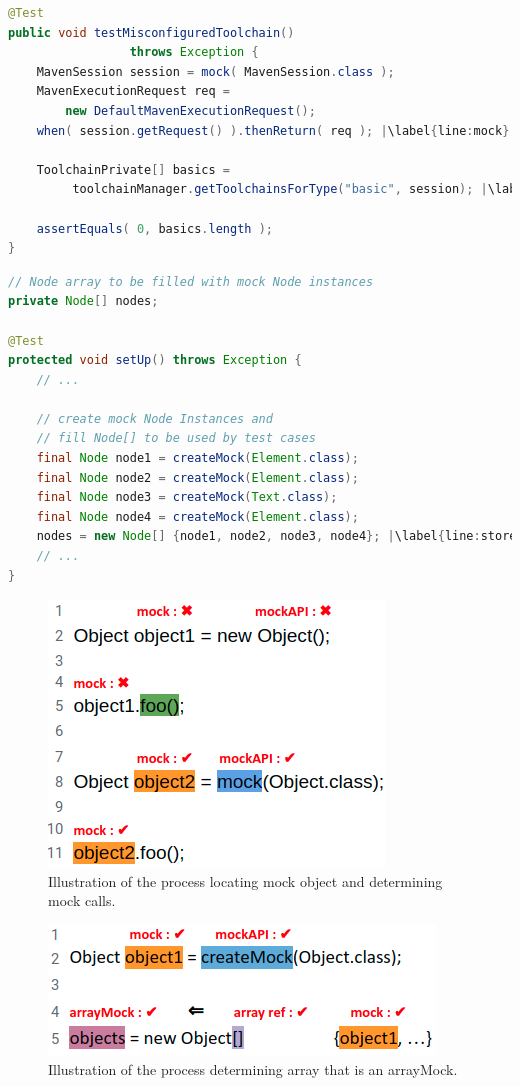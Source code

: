 \begin{lstlisting}[basicstyle=\ttfamily, caption={This code snippet illustrates an example from maven-core, where both the focal method \texttt{getToolchainsForType} and a method invocation \texttt{getRequest} on a mock object occur in test \textit{testMisconfiguredToolchain()}},
basicstyle=\scriptsize\ttfamily,language = Java, framesep=4.5mm, escapechar=|,
framexleftmargin=1.0mm, captionpos=b, xleftmargin=3.5ex, label=lis:mockCall]
@Test
public void testMisconfiguredToolchain()
                 throws Exception {
    MavenSession session = mock( MavenSession.class );
    MavenExecutionRequest req = 
        new DefaultMavenExecutionRequest();
    when( session.getRequest() ).thenReturn( req ); |\label{line:mock}|
    
    ToolchainPrivate[] basics =
         toolchainManager.getToolchainsForType("basic", session); |\label{line:real}|
    
    assertEquals( 0, basics.length );
}
\end{lstlisting}

\begin{lstlisting}[basicstyle=\ttfamily, caption={This example illustrates a field array container holding mock objects from \textit{setup()} in \texttt{NodeListIteratorTest.java}.},
basicstyle=\scriptsize\ttfamily,language = Java, framesep=4.5mm, framexleftmargin=1.0mm, captionpos=b, xleftmargin=3.5ex, label=lis:container, escapechar=|]
// Node array to be filled with mock Node instances
private Node[] nodes;

@Test
protected void setUp() throws Exception {
    // ...

    // create mock Node Instances and 
    // fill Node[] to be used by test cases
    final Node node1 = createMock(Element.class);
    final Node node2 = createMock(Element.class);
    final Node node3 = createMock(Text.class);
    final Node node4 = createMock(Element.class);
    nodes = new Node[] {node1, node2, node3, node4}; |\label{line:storeMocksInArray}|
    // ...
}
\end{lstlisting}


\begin{figure}
    \includegraphics[width=.25\textwidth]{Images/mockInvocationIllustration.png}
    
    \caption{Illustration of the process locating mock object and determining mock calls.}
    \label{fig:focalMethodIllustration}
    
\end{figure}

\begin{figure}
    \includegraphics[width=.25\textwidth]{Images/arrayMockIllustration.png}
    
    \caption{Illustration of the process determining array that is an arrayMock.}
    \label{fig:arrayMockIllustration}
    
\end{figure}
